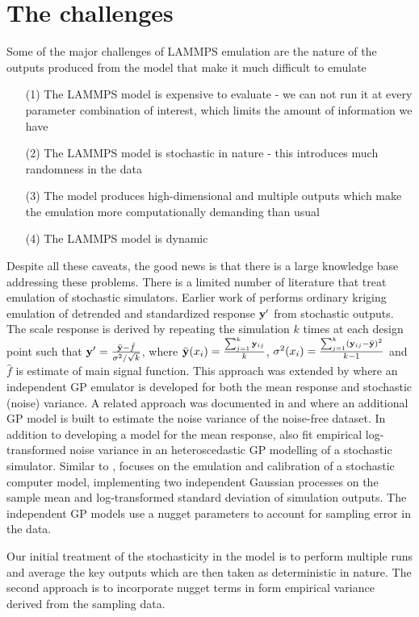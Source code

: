 \documentclass[12pt,titlepage]{report}
\newcommand{\by}{{\bf y}}
\theoremstyle{definition}
\theoremstyle{remark}
\begin{document}
\section{The challenges}
Some of the major challenges of LAMMPS emulation are the nature of the outputs produced from the model that make it much difficult to emulate
\begin{itemize}
\item[(1)] The LAMMPS model is expensive to evaluate - we can not run it at every parameter combination of interest, which limits the amount of information we have 
\item[(2)] The LAMMPS model is stochastic in nature - this introduces much randomness in the data
\item[(3)] The model produces high-dimensional and multiple outputs which make the emulation more computationally demanding than usual
\item[(4)] The LAMMPS model is dynamic
\end{itemize}
Despite all these caveats, the good news is that there is a large knowledge base addressing these problems.
There is a limited number of literature that treat emulation of stochastic simulators. Earlier work of \citet{pd23} performs ordinary kriging emulation of detrended and standardized response $\by'$ from stochastic outputs. 
The scale response is derived by repeating the simulation $k$ times at each design point such that
$\by'=\frac{\bar \by-\hat  f}{\mathbf{\sigma}^2/\sqrt{k}}$, where $\bar \by(x_i)=\frac{\sum_{j=1}^k\by_{ij}}{k}$, $\sigma^2(x_i)=\frac{\sum_{j=1}^{k}(\by_{ij}-\bar \by)^2}{k-1}$ and $\hat  f$ is estimate of main signal function. This approach was extended by \citet{pd24} where an independent GP emulator is developed for both the mean response and stochastic (noise) variance.  A related approach was documented in \citet{pd22} and \citet{pd25} where an additional GP model is built to estimate the noise variance of the noise-free dataset.
In addition to developing a model for the mean response, \citet{pd21} also fit empirical log-transformed noise variance in an heteroscedastic GP modelling of a stochastic simulator.  Similar to \citet{pd24,pd21}, \citet{pd26} focuses on the emulation and calibration of a stochastic computer model, implementing two independent Gaussian processes on the sample mean and log-transformed standard deviation of simulation outputs. The independent GP models use a nugget parameters to account for sampling error in the data. 

Our initial treatment of the stochasticity in the model is to perform multiple runs and average the key outputs which are then taken as deterministic in nature. The second approach is to incorporate nugget terms in form empirical variance derived from the sampling data.
\end{document}
